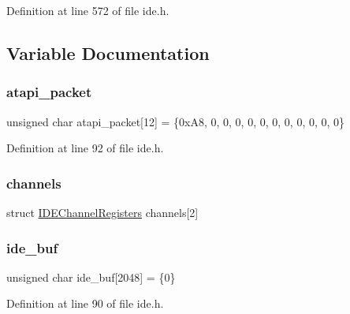 Definition at line 572 of file ide.\+h.



\subsection{Variable Documentation}
\mbox{\label{a00005_a02351861ecf3191d5dbbcc1910b7c109_a02351861ecf3191d5dbbcc1910b7c109}} 
\subsubsection{\texorpdfstring{atapi\+\_\+packet}{atapi\_packet}}
{\footnotesize\ttfamily unsigned char atapi\+\_\+packet\mbox{[}12\mbox{]} = \{0x\+A8, 0, 0, 0, 0, 0, 0, 0, 0, 0, 0, 0\}\hspace{0.3cm}{\ttfamily [static]}}



Definition at line 92 of file ide.\+h.

\mbox{\label{a00005_aecefa15f62cf60846ddb1a56f9153143_aecefa15f62cf60846ddb1a56f9153143}} 
\subsubsection{\texorpdfstring{channels}{channels}}
{\footnotesize\ttfamily struct \hyperlink{a00069}{I\+D\+E\+Channel\+Registers}  channels\mbox{[}2\mbox{]}}

\mbox{\label{a00005_a94f78e77f368421e4fe8faea979d523f_a94f78e77f368421e4fe8faea979d523f}} 
\subsubsection{\texorpdfstring{ide\+\_\+buf}{ide\_buf}}
{\footnotesize\ttfamily unsigned char ide\+\_\+buf\mbox{[}2048\mbox{]} = \{0\}}



Definition at line 90 of file ide.\+h.

\mbox{\label{a00005_a16b42e578786d8541c2cb27334803fa0_a16b42e578786d8541c2cb27334803fa0}} 
